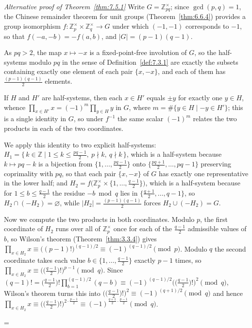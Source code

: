 \documentclass[11pt]{article}
\makeatletter
\theoremstyle{ntstyle}
\let\nt@closedisplay\]
\def\nt@guardedclose{\@ifnextchar\par{\nt@closeafterpar}{\@ifnextchar\end{\postdisplaypenalty\@M\nt@closedisplay}{\nt@closedisplay}}}
\def\nt@closeafterpar\par{\@ifnextchar\par{\nt@closeafterpar}{\@ifnextchar\end{\postdisplaypenalty\@M\nt@closedisplay\par}{\nt@closedisplay\par}}}
\renewenvironment{proof}[1][\proofname]{\par
  \pushQED{\qed}\normalfont\topsep\medskipamount\edef\nt@afterproof{\@endparpenalty=\the\@endparpenalty\relax}\@beginparpenalty\@M\@endparpenalty\@M\let\]\nt@guardedclose\trivlist\item[]\textit{#1\@addpunct{.}} \ignorespaces}{\ifvmode\addpenalty\@M\fi\popQED\nt@afterproof\endtrivlist\@endpefalse}
\newenvironment{altproof}[1][\proofname]{\begin{proof}[#1]\renewcommand{\qedsymbol}{}}{\end{proof}}
\newcommand{\ZmodUnits}[1]{\mathbb{Z}_{#1}^{\times}}
\makeatother
\begin{document}
\begin{altproof}[Alternative proof of Theorem~\ref{thm:7.5.1}] Write $G = \ZmodUnits{pq}$; since $\gcd(p, q)
		= 1$, the Chinese remainder theorem for unit groups (Theorem~\ref{thm:6.6.4}) provides a group
	isomorphism $f : \ZmodUnits{p} \times \ZmodUnits{q}
		\to G$ under which $(-1, -1)$ corresponds to $-1$, so that $f(-a, -b)
		= -f(a, b)$, and $|G| = (p-1)(q-1)$.

	As $pq > 2$, the map $x \mapsto
		-x$ is a fixed-point-free involution of $G$, so the half-systems modulo
	$pq$ in the sense of Definition~\ref{def:7.3.1} are exactly the subsets containing
	exactly one element of each pair $\{x, -x\}$, and each of them has
	$\tfrac{(p-1)(q-1)}{2}$ elements.

	If $H$ and $H'$
	are half-systems, then each $x \in H'$ equals $\pm y$ for exactly one
	$y \in H$, whence $\prod_{x \in H'} x = (-1)^{m} \prod_{y \in H} y$ in
	$G$, where $m = \#\{y \in H \mid -y \in H'\}$; this is a single
	identity in $G$, so under $f^{-1}$ the same scalar $(-1)^{m}$ relates
	the two products in each of the two coordinates.

	We apply this identity to two explicit
	half-systems: $H_1 = \{\, k \in \mathbb{Z} \mid 1 \le k \le
		\tfrac{pq-1}{2},\ p \nmid k,\ q \nmid k \,\}$, which is a half-system
	because $k \mapsto pq - k$ is a bijection from $\{1, \ldots,
		\tfrac{pq-1}{2}\}$ onto $\{\tfrac{pq+1}{2}, \ldots, pq-1\}$
	preserving coprimality with $pq$, so that each pair $\{x, -x\}$ of $G$
	has exactly one representative in the lower half; and $H_2 =
		f\big(\ZmodUnits{p} \times \{1, \ldots,
		\tfrac{q-1}{2}\}\big)$, which is a half-system because for $1 \le b
		\le \tfrac{q-1}{2}$ the residue $-b \bmod q$ lies in
	$\{\tfrac{q+1}{2}, \ldots, q-1\}$, so $H_2 \cap (-H_2) = \varnothing$,
	while $|H_2| = \tfrac{(p-1)(q-1)}{2}$ forces $H_2 \cup (-H_2) = G$.

	Now we compute the two products in both coordinates. Modulo $p$, the
	first coordinate of $H_2$ runs over all of $\ZmodUnits{p}$
	once for each of the $\tfrac{q-1}{2}$ admissible values of $b$, so
	Wilson's theorem (Theorem~\ref{thm:3.3.4}) gives $\prod_{x \in H_2} x \equiv
		\big((p-1)!\big)^{(q-1)/2} \equiv (-1)^{(q-1)/2} \pmod{p}$. Modulo $q$
	the second coordinate takes each value $b \in \{1, \ldots,
		\tfrac{q-1}{2}\}$ exactly $p-1$ times, so $\prod_{x \in H_2} x \equiv
		\big(\big(\tfrac{q-1}{2}\big)!\big)^{p-1} \pmod{q}$. Since
	$(q-1)! = \big(\tfrac{q-1}{2}\big)! \prod_{b=1}^{(q-1)/2}(q - b)
		\equiv (-1)^{(q-1)/2}\big(\big(\tfrac{q-1}{2}\big)!\big)^{2}
		\pmod{q}$, Wilson's theorem turns this into
	$\big(\big(\tfrac{q-1}{2}\big)!\big)^{2} \equiv (-1)^{(q+1)/2}
		\pmod{q}$ and hence $\prod_{x \in H_2} x \equiv
		\big(\big(\tfrac{q-1}{2}\big)!\big)^{2 \cdot \frac{p-1}{2}} \equiv
		(-1)^{\frac{q+1}{2}\cdot\frac{p-1}{2}} \pmod{q}$.


\end{altproof}
\end{document}
